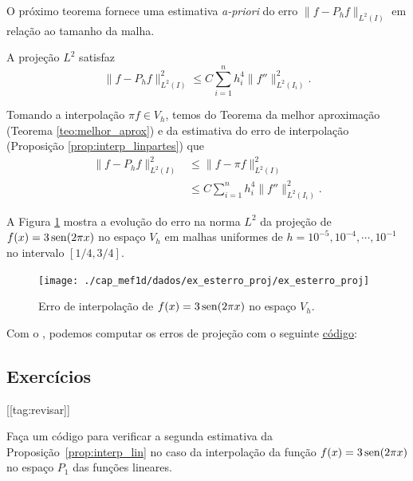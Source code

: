 O próximo teorema fornece uma estimativa {\it a-priori} do erro $\|f-P_h f\|_{L^2(I)}$ em relação ao tamanho da malha.

\begin{teo}\label{teo:erro_proj_1d}
  A projeção $L^2$ satisfaz
  \begin{equation}
    \|f-P_hf\|_{L^2(I)}^2 \leq C\sum_{i=1}^n h_i^4\|f''\|_{L^2(I_i)}^2.
  \end{equation}
\end{teo}
\begin{dem}
  Tomando a interpolação $\pi f \in V_h$, temos do Teorema da melhor aproximação (Teorema \ref{teo:melhor_aprox}) e da estimativa do erro de interpolação (Proposição \ref{prop:interp_linpartes}) que
  \begin{align}
    \|f - P_hf\|_{L^2(I)}^2 &\leq \|f-\pi f\|_{L^2(I)}^2\\
    &\leq C\sum_{i=1}^n h_i^4\|f''\|_{L^2(I_i)}^2.
  \end{align}
\end{dem}

\begin{ex}\label{ex:esterro_proj}
  A Figura \ref{fig:ex_esterro_proj} mostra a evolução do erro na norma $L^2$ da projeção de $f(x)=3\operatorname{sen}(2\pi x)$ no espaço $V_h$ em malhas uniformes de $h=10^{-5}, 10^{-4}, \cdots, 10^{-1}$ no intervalo $[1/4, 3/4]$.

  \begin{figure}[h!]
    \centering
    \texttt{[image: ./cap\_mef1d/dados/ex\_esterro\_proj/ex\_esterro\_proj]}
    \caption{Erro de interpolação de $f(x)=3\operatorname{sen}(2\pi x)$ no espaço $V_h$.}
    \label{fig:ex_esterro_proj}
  \end{figure}

\ifispython
Com o \fenics, podemos computar os erros de projeção com o seguinte \href{https://github.com/phkonzen/notas/blob/master/src/MetodoElementosFinitos/cap_mef1d/dados/ex_esterro_proj/ex_esterro_proj.py}{código}:

\fi
\end{ex}

\subsection{Exercícios}
[[tag:revisar]]

\begin{exer}
  Faça um código para verificar a segunda estimativa da Proposição~\ref{prop:interp_lin} no caso da interpolação da função $f(x) = 3\operatorname{sen}(2\pi x)$ no espaço $P_1$ das funções lineares.
\end{exer}


